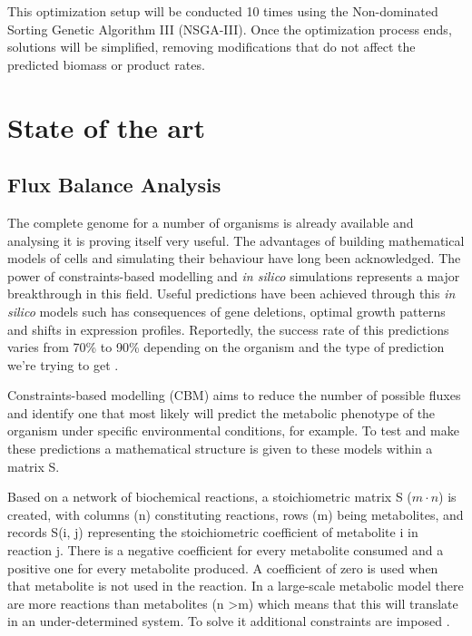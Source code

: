 \documentclass[runningheads]{llncs}
\begin{document}
This optimization setup will be conducted 10 times using the Non-dominated Sorting Genetic Algorithm III (NSGA-III). Once the optimization process ends, solutions will be simplified, removing modifications that do not affect the predicted biomass or product rates.


\section{State of the art}

\subsection{Flux Balance Analysis} 
The complete genome for a number of organisms is already available and analysing it is proving itself very useful. The advantages of building mathematical models of cells and simulating their behaviour have long been acknowledged. The power of constraints-based modelling and \emph{in silico} simulations represents a major breakthrough in this field. Useful predictions have been achieved through this \emph{in silico} models such has consequences of gene deletions, optimal growth patterns and shifts in expression profiles. Reportedly, the success rate of this predictions varies from 70\% to 90\% depending on the organism and the type of prediction we're trying to get \cite{price2003genome}.

Constraints-based modelling (CBM) aims to reduce the number of possible fluxes and identify one that most likely will predict the metabolic phenotype of the organism under specific environmental conditions, for example. To test and make these predictions a mathematical structure is given to these models within a matrix S.

Based on a network of biochemical reactions, a stoichiometric matrix S (\(m \cdot n\)) is created, with columns (n) constituting reactions, rows (m) being metabolites, and records S(i, j) representing the stoichiometric coefficient of metabolite i in reaction j. There is a negative coefficient for every metabolite consumed and a positive one for every metabolite produced. A coefficient of zero is used when that metabolite is not used in the reaction. In a large-scale metabolic model there are more reactions than metabolites (n \textgreater m) which means that this will translate in an under-determined system. To solve it additional constraints are
imposed \cite{haggart2011whole}. 
\end{document}
